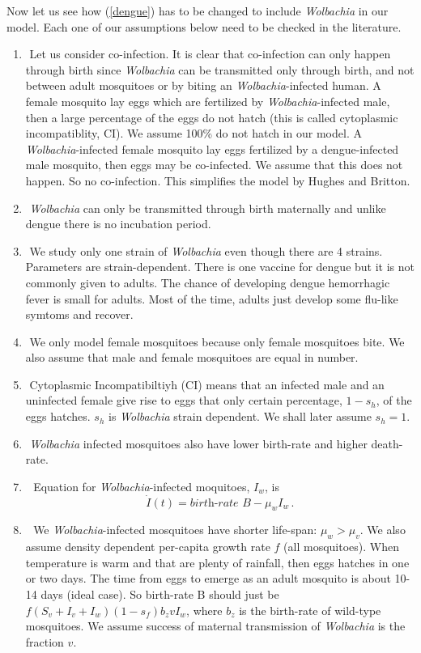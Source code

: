 \documentclass[12pt,leqno]{article}
\begin{document}
Now let us see how (\ref{dengue}) has to be changed to include {\it Wolbachia} in our model. Each one of our assumptions below need to be checked in the literature.  
\begin{enumerate}
\item\,\,Let us consider co-infection. It is clear that co-infection can only happen through birth since {\it Wolbachia} can be transmitted only through birth, and not between adult mosquitoes or by biting an {\it Wolbachia}-infected human. A female mosquito lay eggs which are fertilized by {\it Wolbachia}-infected male, then a large percentage of the eggs do not hatch (this is called cytoplasmic incompatiblity, CI). We assume 100\% do not hatch in our model. A {\it Wolbachia}-infected female mosquito lay eggs fertilized by a dengue-infected male mosquito, then eggs may be co-infected. We assume that this does not happen. So no co-infection. This simplifies the model by Hughes and Britton. 
\item\,\,{\it Wolbachia} can only be transmitted through birth maternally and unlike dengue there is no incubation period.
\item\,\,We study only one strain of {\it Wolbachia} even though there are 4 strains. Parameters are strain-dependent. There is one vaccine for dengue but it is not commonly given to adults.  The chance of developing dengue hemorrhagic fever is small for adults. Most of the time, adults just develop some flu-like symtoms and recover.
\item\,\,We only model female mosquitoes because only female mosquitoes bite. We also assume that male and female mosquitoes are equal in number.
\item\,\,Cytoplasmic Incompatibiltiyh (CI) means that an infected male and an uninfected female give rise to eggs that only certain percentage, $1-s_h$, of the eggs hatches. $s_h$ is {\it Wolbachia} strain dependent. We shall later assume $s_h = 1.$
\item\,\,{\it Wolbachia} infected mosquitoes also have lower birth-rate and higher death-rate.  
\item\,\, Equation for {\it Wolbachia}-infected moquitoes, $I_w$, is
\begin{equation}\label{Wolbachia}
\dot{I}(t) = \textit{birth-rate B} - \mu_w I_w\,. 
\end{equation}
\item\,\,
We {\it Wolbachia}-infected mosquitoes have shorter life-span: $\mu_w > \mu_v$. We also assume density dependent per-capita growth rate $f$ (all mosquitoes). When temperature is warm and that are plenty of rainfall, then eggs hatches in one or two days. The time from eggs to emerge as an adult mosquito is about 10-14 days (ideal case).
So birth-rate B  should just be $f(S_v+I_v+I_w)(1-s_f)b_z v I_w$, where $b_z$ is the birth-rate of wild-type mosquitoes. We assume success of maternal transmission of {\it Wolbachia} is the fraction $v$.
\end{enumerate}  
\end{document}
